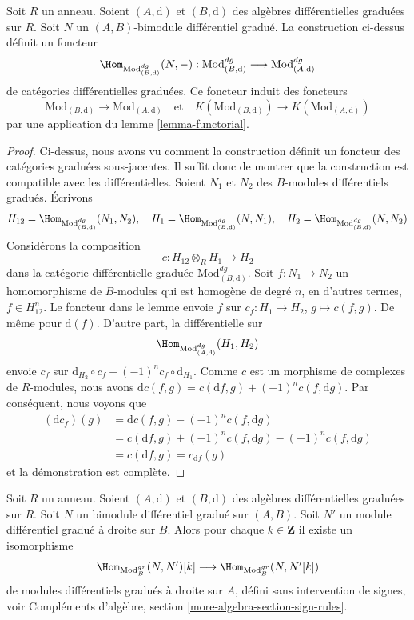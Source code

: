\begin{lemma}
\label{lemma-hom}
Soit $R$ un anneau. Soient $(A, \text{d})$ et $(B, \text{d})$
des algèbres différentielles graduées sur $R$. Soit $N$ un
$(A, B)$-bimodule différentiel gradué. La construction ci-dessus
définit un foncteur
$$
\Hom_{\text{Mod}^{dg}_{(B, \text{d})}}(N, -) :
\text{Mod}^{dg}_{(B, \text{d})}
\longrightarrow
\text{Mod}^{dg}_{(A, \text{d})}
$$
de catégories différentielles graduées. Ce foncteur induit des foncteurs
$$
\text{Mod}_{(B, \text{d})} \to \text{Mod}_{(A, \text{d})}
\quad\text{et}\quad
K(\text{Mod}_{(B, \text{d})}) \to K(\text{Mod}_{(A, \text{d})})
$$
par une application du lemme \ref{lemma-functorial}.
\end{lemma}

\begin{proof}
Ci-dessus, nous avons vu comment la construction définit un foncteur des
catégories graduées sous-jacentes. Il suffit donc de montrer que la construction est
compatible avec les différentielles. Soient $N_1$ et $N_2$ des $B$-modules
différentiels gradués. Écrivons
$$
H_{12} = \Hom_{\text{Mod}^{dg}_{(B, \text{d})}}(N_1, N_2),\quad
H_1 = \Hom_{\text{Mod}^{dg}_{(B, \text{d})}}(N, N_1),\quad
H_2 = \Hom_{\text{Mod}^{dg}_{(B, \text{d})}}(N, N_2)
$$
Considérons la composition
$$
c : H_{12} \otimes_R H_1 \longrightarrow H_2
$$
dans la catégorie différentielle graduée $\text{Mod}^{dg}_{(B,
\text{d})}$. Soit $f : N_1 \to N_2$ un homomorphisme de $B$-modules qui est
homogène de degré $n$, en d'autres termes, $f \in
H_{12}^n$. Le foncteur dans le lemme envoie $f$ sur $c_f : H_1 \to H_2$, $g \mapsto c(f,
g)$. De même pour $\text{d}(f)$. D'autre part, la différentielle sur
$$
\Hom_{\text{Mod}^{dg}_{(A, \text{d})}}(H_1, H_2)
$$
envoie $c_f$ sur $\text{d}_{H_2} \circ c_f - (-1)^n c_f \circ \text{d}_{H_1}$. Comme
$c$ est un morphisme de complexes de $R$-modules, nous avons
$\text{d} c(f, g) = c(\text{d}f, g) + (-1)^n c(f, \text{d}g)$. Par
conséquent, nous voyons que
\begin{align*}
(\text{d}c_f)(g)
& =
\text{d}c(f,g) - (-1)^n c(f, \text{d}g) \\
& =
c(\text{d}f, g) + (-1)^n c(f, \text{d}g) - (-1)^n c(f, \text{d}g) \\ & =
c(\text{d}f,
g) = c_{\text{d}f}(g)
\end{align*}
et la démonstration est complète.
\end{proof}

\begin{remark}
\label{remark-shift-hom-no-sign}
Soit $R$ un anneau. Soient $(A, \text{d})$ et $(B, \text{d})$
des algèbres différentielles graduées sur $R$. Soit $N$ un
bimodule différentiel gradué sur $(A, B)$. Soit $N'$ un module différentiel gradué
à droite sur $B$. Alors pour chaque $k \in \mathbf{Z}$ il existe
un isomorphisme
$$
\Hom_{\text{Mod}^{gr}_B}(N, N')[k]
\longrightarrow
\Hom_{\text{Mod}^{gr}_B}(N, N'[k])
$$
de modules différentiels gradués à droite sur $A$, défini sans intervention
de signes, voir Compléments d'algèbre, section \ref{more-algebra-section-sign-rules}.
\end{remark}

